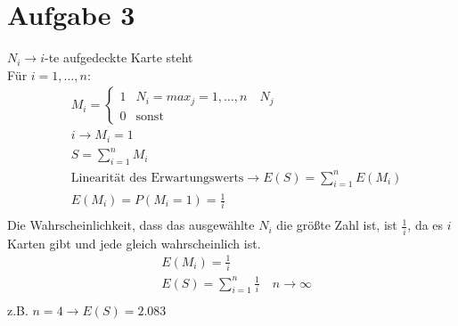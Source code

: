 \pagebreak
\section*{Aufgabe 3}
$ N_i \rightarrow i $-te aufgedeckte Karte steht\\
Für $ i=1,\ldots,n $:\\
\begin{align*}
&M_i=\begin{cases}
1&N_i=max_j = 1,\ldots,n\quad N_j\\
0&\text{sonst}
\end{cases}\\
&i \rightarrow M_i=1\\
&S=\sum_{i=1}^{n}M_i\\
&\text{Linearität des Erwartungswerts} \rightarrow E(S)=\sum_{i=1}^{n}E(M_i)\\
&E(M_i)=P(M_i=1)=\frac{1}{i}\\
\end{align*}
Die Wahrscheinlichkeit, dass das ausgewählte $ N_i $ die größte Zahl ist, ist $ \frac{1}{i} $, da es $ i $ Karten gibt und jede gleich wahrscheinlich ist.\\
\begin{align*}
&E(M_i)=\frac{1}{i}\\
&E(S)=\sum_{i=1}^{n}\frac{1}{i}\quad n \rightarrow \infty\\
\end{align*}
z.B. $ n=4 \rightarrow E(S)= 2.083 $
